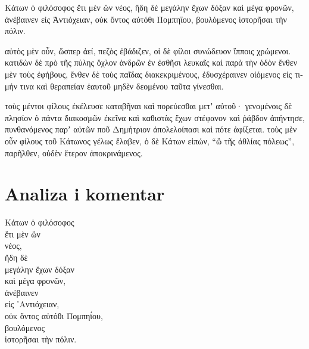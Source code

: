 {\large

\begin{greek}

\noindent  Κάτων ὁ φιλόσοφος ἔτι μὲν ὢν νέος, ἤδη δὲ μεγάλην ἔχων δόξαν καὶ μέγα φρονῶν, ἀνέβαινεν εἰς Ἀντιόχειαν, οὐκ ὄντος αὐτόθι Πομπηΐου, βουλόμενος ἱστορῆσαι τὴν πόλιν.

\noindent αὐτὸς μὲν οὖν, ὥσπερ ἀεί, πεζὸς ἐβάδιζεν, οἱ δὲ φίλοι συνώδευον ἵπποις χρώμενοι. κατιδὼν δὲ πρὸ τῆς πύλης ὄχλον ἀνδρῶν ἐν ἐσθῆσι λευκαῖς καὶ παρὰ τὴν ὁδὸν ἔνθεν μὲν τοὺς ἐφήβους, ἔνθεν δὲ τοὺς παῖδας διακεκριμένους, ἐδυσχέραινεν οἰόμενος εἰς τιμήν τινα καὶ θεραπείαν ἑαυτοῦ μηδὲν δεομένου ταῦτα γίνεσθαι.

\noindent τοὺς μέντοι φίλους ἐκέλευσε καταβῆναι καὶ πορεύεσθαι μετʼ αὐτοῦ· γενομένοις δὲ πλησίον ὁ πάντα διακοσμῶν ἐκεῖνα καὶ καθιστὰς ἔχων στέφανον καὶ ῥάβδον ἀπήντησε, πυνθανόμενος παρʼ αὐτῶν ποῦ Δημήτριον ἀπολελοίπασι καὶ πότε ἀφίξεται. τοὺς μὲν οὖν φίλους τοῦ Κάτωνος γέλως ἔλαβεν, ὁ δὲ Κάτων εἰπών, ``ὢ τῆς ἀθλίας πόλεως'', παρῆλθεν, οὐδὲν ἕτερον ἀποκρινάμενος.

\end{greek}

}

\newpage

\section*{Analiza i komentar}


{\large
\begin{greek}
\noindent Κάτων ὁ φιλόσοφος \\
\tabto{2em} ἔτι μὲν ὢν \\
\tabto{4em} νέος, \\
\tabto{2em} ἤδη δὲ \\
\tabto{4em} μεγάλην ἔχων δόξαν \\
\tabto{2em} καὶ μέγα φρονῶν, \\
ἀνέβαινεν \\
\tabto{2em} εἰς ᾿Αντιόχειαν, \\
οὐκ ὄντος αὐτόθι Πομπηΐου, \\
βουλόμενος \\
\tabto{2em} ἱστορῆσαι τὴν πόλιν. \\

\end{greek}
}

